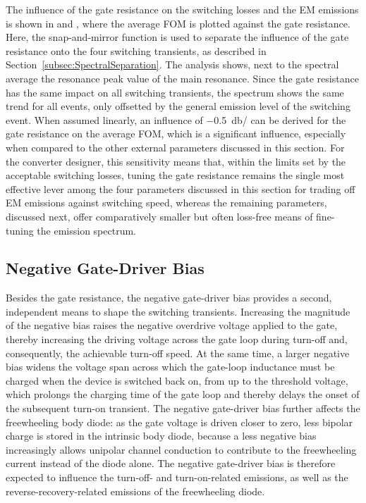 The influence of the gate resistance on the switching losses and the EM emissions is shown in  and , where the average FOM is plotted against the gate resistance.
Here, the snap-and-mirror function is used to separate the influence of the gate resistance onto the four switching transients, as described in Section~\ref{subsec:SpectralSeparation}.
The analysis shows, next to the spectral average the resonance peak value of the main resonance.
Since the gate resistance has the same impact on all switching transients, the spectrum shows the same trend for all events, only offsetted by the general emission level of the switching event.
When assumed linearly, an influence of \SI{-0.5}{db/\Omega} can be derived for the gate resistance on the average FOM, which is a significant influence, especially when compared to the other external parameters discussed in this section.
For the converter designer, this sensitivity means that, within the limits set by the acceptable switching losses, tuning the gate resistance remains the single most effective lever among the four parameters discussed in this section for trading off EM emissions against switching speed, whereas the remaining parameters, discussed next, offer comparatively smaller but often loss-free means of fine-tuning the emission spectrum.

\FloatBarrier

\subsection{Negative Gate-Driver Bias}

Besides the gate resistance, the negative gate-driver bias  provides a second, independent means to shape the switching transients.
Increasing the magnitude of the negative bias raises the negative overdrive voltage applied to the gate, thereby increasing the driving voltage across the gate loop during turn-off and, consequently, the achievable turn-off speed.
At the same time, a larger negative bias widens the voltage span across which the gate-loop inductance must be charged when the device is switched back on, from  up to the threshold voltage, which prolongs the charging time of the gate loop and thereby delays the onset of the subsequent turn-on transient.
The negative gate-driver bias further affects the freewheeling body diode: as the gate voltage is driven closer to zero, less bipolar charge is stored in the intrinsic body diode, because a less negative bias increasingly allows unipolar channel conduction to contribute to the freewheeling current instead of the diode alone.
The negative gate-driver bias is therefore expected to influence the turn-off- and turn-on-related emissions, as well as the reverse-recovery-related emissions of the freewheeling diode.

